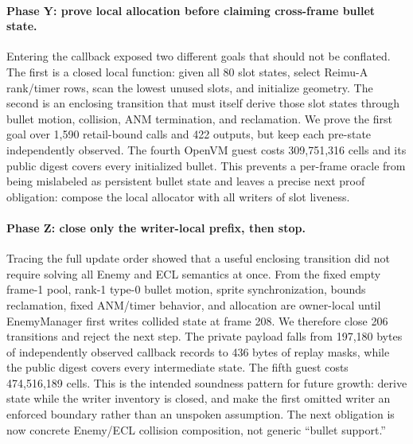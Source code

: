 \paragraph{Phase Y: prove local allocation before claiming cross-frame bullet
state.}
Entering the callback exposed two different goals that should not be conflated.
The first is a closed local function: given all 80 slot states, select Reimu-A
rank/timer rows, scan the lowest unused slots, and initialize geometry.  The
second is an enclosing transition that must itself derive those slot states
through bullet motion, collision, ANM termination, and reclamation.  We prove
the first goal over 1,590 retail-bound calls and 422 outputs, but keep each
pre-state independently observed.  The fourth OpenVM guest costs 309,751,316
cells and its public digest covers every initialized bullet.  This prevents a
per-frame oracle from being mislabeled as persistent bullet state and leaves a
precise next proof obligation: compose the local allocator with all writers of
slot liveness.

\paragraph{Phase Z: close only the writer-local prefix, then stop.}
Tracing the full update order showed that a useful enclosing transition did
not require solving all Enemy and ECL semantics at once.  From the fixed empty
frame-1 pool, rank-1 type-0 bullet motion, sprite synchronization, bounds
reclamation, fixed ANM/timer behavior, and allocation are owner-local until
EnemyManager first writes collided state at frame 208.  We therefore close 206
transitions and reject the next step.  The private payload falls from 197,180
bytes of independently observed callback records to 436 bytes of replay masks,
while the public digest covers every intermediate state.  The fifth guest costs
474,516,189 cells.  This is the intended soundness pattern for future growth:
derive state while the writer inventory is closed, and make the first omitted
writer an enforced boundary rather than an unspoken assumption.  The next
obligation is now concrete Enemy/ECL collision composition, not generic
``bullet support.''

